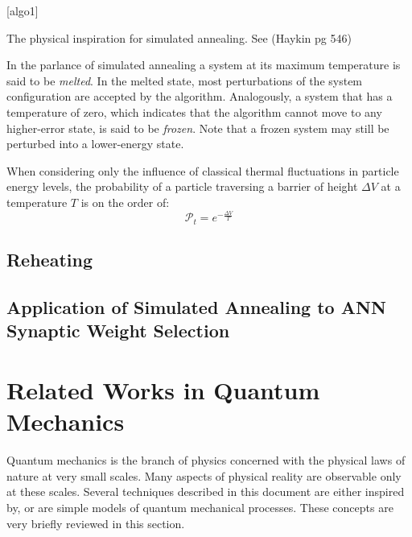 \documentclass[11pt]{afthesis}
\begin{document}
[algo1]

The physical inspiration for simulated annealing. See (Haykin pg 546)


In the parlance of simulated annealing \cite{kirkpatrick1983} a system at its maximum temperature is said to be \textit{melted}. In the melted state, most perturbations of the system configuration are accepted by the algorithm. Analogously, a system that has a temperature of zero, which indicates that the algorithm cannot move to any higher-error state, is said to be \textit{frozen}. Note that a frozen system may still be perturbed into a lower-energy state.

When considering only the influence of classical thermal fluctuations in particle energy levels, the probability of a particle traversing a barrier of height \begin{math} \Delta V \end{math} at a temperature \begin{math} T \end{math} is on the order of: \begin{equation} 
\mathcal{P}_t = e^{-\frac{\Delta V}{T}} 
\end{equation}

\subsection{Reheating}

\subsection{Application of Simulated Annealing to ANN Synaptic Weight Selection}


\section{Related Works in Quantum Mechanics}


Quantum mechanics is the branch of physics concerned with the physical laws of nature at very small scales. Many aspects of physical reality are observable only at these scales. Several techniques described in this document are either inspired by, or are simple models of quantum mechanical processes. These concepts are very briefly reviewed in this section. 
\end{document}

